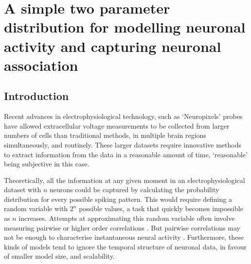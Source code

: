 
\chapter{A simple two parameter distribution for modelling neuronal activity and capturing neuronal association}

\label{chap:comb}


\section{Introduction}
Recent advances in electrophysiological technology, such as `Neuropixels' probes \parencite{jun} have allowed extracellular voltage measurements to be collected from larger numbers of cells than traditional methods, in multiple brain regions simultaneously, and routinely. These larger datasets require innovative methods to extract information from the data in a reasonable amount of time, `reasonable' being subjective in this case.

Theoretically, all the information at any given moment in an electrophysiological dataset with $n$ neurons could be captured by calculating the probability distribution for every possible spiking pattern. This would require defining a random variable with $2^n$ possible values, a task that quickly becomes impossible as $n$ increases. Attempts at approximating this random variable often involve measuring pairwise or higher order correlations  \parencite{schneidman, flach, ganmor}. But pairwise correlations may not be enough to characterise instantaneous neural activity \parencite{tkacik}. Furthermore, these kinds of models tend to ignore the temporal structure of neuronal data, in favour of smaller model size, and scalability.


